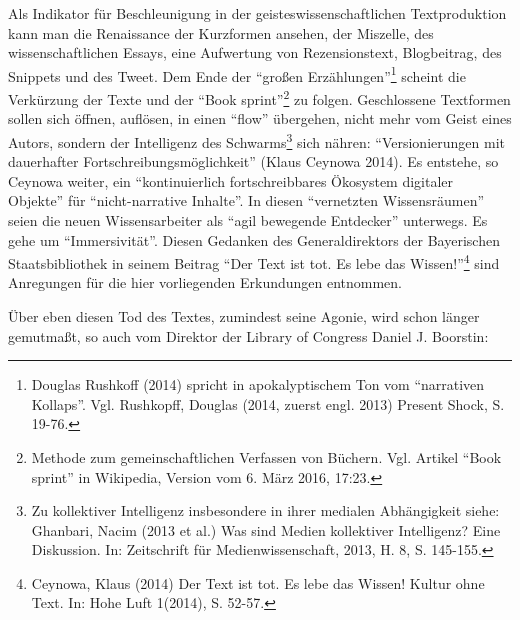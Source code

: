 \documentclass[a4paper,
fontsize=11pt,
oneside,
numbers=noperiodatend,
parskip=half-,
bibliography=totoc,
final
]{scrartcl}
\begin{document}
Als Indikator für Beschleunigung in der geisteswissenschaftlichen
Textproduktion kann man die Renaissance der Kurzformen ansehen, der
Miszelle, des wissenschaftlichen Essays, eine Aufwertung von
Rezensionstext, Blogbeitrag, des Snippets und des Tweet. Dem Ende der
\enquote{großen Erzählungen}\footnote{Douglas Rushkoff (2014) spricht in
  apokalyptischem Ton vom \enquote{narrativen Kollaps}. Vgl. Rushkopff,
  Douglas (2014, zuerst engl. 2013) Present Shock, S. 19-76.} scheint
die Verkürzung der Texte und der \enquote{Book sprint}\footnote{Methode
  zum gemeinschaftlichen Verfassen von Büchern. Vgl. Artikel
  \enquote{Book sprint} in Wikipedia, Version vom 6. März 2016, 17:23.}
zu folgen. Geschlossene Textformen sollen sich öffnen, auflösen, in
einen \enquote{flow} übergehen, nicht mehr vom Geist eines Autors,
sondern der Intelligenz des Schwarms\footnote{Zu kollektiver Intelligenz
  insbesondere in ihrer medialen Abhängigkeit siehe: Ghanbari, Nacim
  (2013 et al.) Was sind Medien kollektiver Intelligenz? Eine
  Diskussion. In: Zeitschrift für Medienwissenschaft, 2013, H. 8, S.
  145-155.} sich nähren: \enquote{Versionierungen mit dauerhafter
Fortschreibungsmöglichkeit} (Klaus Ceynowa 2014). Es entstehe, so
Ceynowa weiter, ein \enquote{kontinuierlich fortschreibbares Ökosystem
digitaler Objekte} für \enquote{nicht-narrative Inhalte}. In diesen
\enquote{vernetzten Wissensräumen} seien die neuen Wissensarbeiter als
\enquote{agil bewegende Entdecker} unterwegs. Es gehe um
\enquote{Immersivität}. Diesen Gedanken des Generaldirektors der
Bayerischen Staatsbibliothek in seinem Beitrag \enquote{Der Text ist
tot. Es lebe das Wissen!}\footnote{Ceynowa, Klaus (2014) Der Text ist
  tot. Es lebe das Wissen! Kultur ohne Text. In: Hohe Luft 1(2014), S.
  52-57.} sind Anregungen für die hier vorliegenden Erkundungen
entnommen.

Über eben diesen Tod des Textes, zumindest seine Agonie, wird schon
länger gemutmaßt, so auch vom Direktor der Library of Congress Daniel J.
Boorstin:
\end{document}
